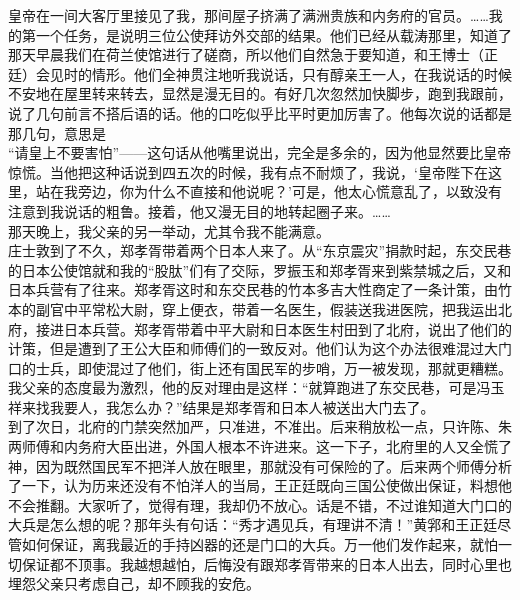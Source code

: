 皇帝在一间大客厅里接见了我，那间屋子挤满了满洲贵族和内务府的官员。……我的第一个任务，是说明三位公使拜访外交部的结果。他们已经从载涛那里，知道了那天早晨我们在荷兰使馆进行了磋商，所以他们自然急于要知道，和王博士（正廷）会见时的情形。他们全神贯注地听我说话，只有醇亲王一人，在我说话的时候不安地在屋里转来转去，显然是漫无目的。有好几次忽然加快脚步，跑到我跟前，说了几句前言不搭后语的话。他的口吃似乎比平时更加厉害了。他每次说的话都是那几句，意思是\\

“请皇上不要害怕”——这句话从他嘴里说出，完全是多余的，因为他显然要比皇帝惊慌。当他把这种话说到四五次的时候，我有点不耐烦了，我说，‘皇帝陛下在这里，站在我旁边，你为什么不直接和他说呢？’可是，他太心慌意乱了，以致没有注意到我说话的粗鲁。接着，他又漫无目的地转起圈子来。……\\

那天晚上，我父亲的另一举动，尤其令我不能满意。\\

庄士敦到了不久，郑孝胥带着两个日本人来了。从“东京震灾”捐款时起，东交民巷的日本公使馆就和我的“股肽”们有了交际，罗振玉和郑孝胥来到紫禁城之后，又和日本兵营有了往来。郑孝胥这时和东交民巷的竹本多吉大性商定了一条计策，由竹本的副官中平常松大尉，穿上便衣，带着一名医生，假装送我进医院，把我运出北府，接进日本兵营。郑孝胥带着中平大尉和日本医生村田到了北府，说出了他们的计策，但是遭到了王公大臣和师傅们的一致反对。他们认为这个办法很难混过大门口的士兵，即使混过了他们，街上还有国民军的步哨，万一被发现，那就更糟糕。我父亲的态度最为激烈，他的反对理由是这样：“就算跑进了东交民巷，可是冯玉祥来找我要人，我怎么办？”结果是郑孝胥和日本人被送出大门去了。\\

到了次日，北府的门禁突然加严，只准进，不准出。后来稍放松一点，只许陈、朱两师傅和内务府大臣出进，外国人根本不许进来。这一下子，北府里的人又全慌了神，因为既然国民军不把洋人放在眼里，那就没有可保险的了。后来两个师傅分析了一下，认为历来还没有不怕洋人的当局，王正廷既向三国公使做出保证，料想他不会推翻。大家听了，觉得有理，我却仍不放心。话是不错，不过谁知道大门口的大兵是怎么想的呢？那年头有句话：“秀才遇见兵，有理讲不清！”黄郛和王正廷尽管如何保证，离我最近的手持凶器的还是门口的大兵。万一他们发作起来，就怕一切保证都不顶事。我越想越怕，后悔没有跟郑孝胥带来的日本人出去，同时心里也埋怨父亲只考虑自己，却不顾我的安危。\\

